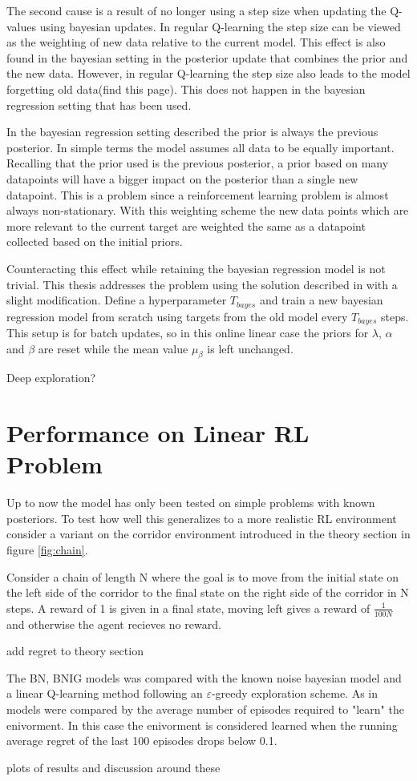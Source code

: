 The second cause is a result of no longer using a step size when updating the Q-values using bayesian updates. In regular Q-learning the step size can be viewed as the weighting of new data relative to the current model. This effect is also found in the bayesian setting in the posterior update that combines the prior and the new data. However, in regular Q-learning the step size also leads to the model forgetting old data(\cite{sutton_barto_2018}\todo find this page). This does not happen in the bayesian regression setting that has been used.

In the bayesian regression setting described the prior is always the previous posterior. In simple terms the model assumes all data to be equally important. Recalling that the prior used is the previous posterior, a prior based on many datapoints will have a bigger impact on the posterior than a single new datapoint. This is a problem since a reinforcement learning problem is almost always non-stationary. With this weighting scheme the new data points which are more relevant to the current target are weighted the same as a datapoint collected based on the initial priors.

Counteracting this effect while retaining the bayesian regression model is not trivial. This thesis addresses the problem using the solution described in \cite{azziz_2018} with a slight modification. Define a hyperparameter $T_{bayes}$ and train a new bayesian regression model from scratch using targets from the old model every $T_{bayes}$ steps. This setup is for batch updates, so in this online linear case the priors for $\lambda$, $\alpha$ and $\beta$ are reset while the mean value $\mu_\beta$ is left unchanged. 

\todo Deep exploration?

\section{Performance on Linear RL Problem}

Up to now the model has only been tested on simple problems with known posteriors. To test how well this generalizes to a more realistic RL environment consider a variant on the corridor environment introduced in the theory section in figure \ref{fig:chain}.

Consider a chain of length N where the goal is to move from the initial state on the left side of the corridor to the final state on the right side of the corridor in N steps. A reward of 1 is given in a final state, moving left gives a reward of $\frac{1}{100N}$ and otherwise the agent recieves no reward.

\todo add regret to theory section

The BN, BNIG models was compared with the known noise bayesian model and a linear Q-learning method following an $\varepsilon$-greedy exploration scheme. As in \cite{osband_2018} models were compared by the average number of episodes required to "learn" the enivorment. In this case the enivorment is considered learned when the running average regret of the last 100 episodes drops below 0.1.

\todo plots of results and discussion around these


\cleardoublepage